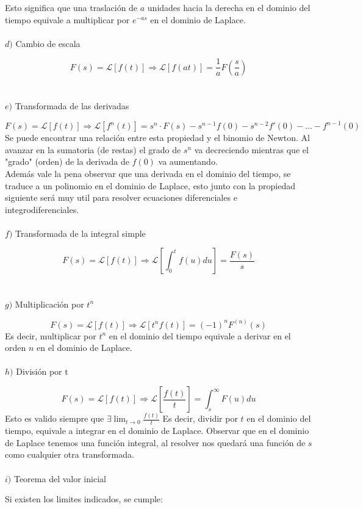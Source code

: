 \documentclass[]{article}
\begin{document}
Esto significa que una traslación de $a$ unidades hacia la derecha en el dominio del tiempo equivale a multiplicar por $e^{-as}$ en el dominio de Laplace.
\\
\\
$d)$ Cambio de escala


$$
F(s) = \mathscr{L}[f(t)] \Rightarrow \mathscr{L}[f(at)] = \frac{1}{a}F(\frac{s}{a})	
$$
\\
\\
$e)$ Transformada de las derivadas

$$
F(s) = \mathscr{L}[f(t)] \Rightarrow \mathscr{L}[f^{n}(t)] = s^{n}\cdot F(s) -s^{n-1}f(0) - s^{n-2} f'(0) - \dots - f^{n-1}(0)
$$
Se puede encontrar una relación entre esta propiedad y el binomio de Newton. Al avanzar en la sumatoria (de restas) el grado de $s^{n}$ va decreciendo mientras que el "grado" (orden) de la derivada de $f(0)$ va aumentando.\\
Además vale la pena observar que una derivada en el dominio del tiempo, se traduce a un polinomio en el dominio de Laplace, esto junto con la propiedad siguiente será muy util para resolver ecuaciones diferenciales e integrodiferenciales.
\\
\\
$f)$ Transformada de la integral simple

$$
F(s) = \mathscr{L}[f(t)] \Rightarrow \mathscr{L}[\int_{0}^{t}f(u)du] = \frac{F(s)}{s}
$$
\\
\\
$g)$ Multiplicación por $t^{n}$

$$
F(s) = \mathscr{L}[f(t)] \Rightarrow \mathscr{L}[t^{n}f(t)] = (-1)^{n}F^{(n)}(s)
$$
Es decir, multiplicar por $t^{n}$	en el dominio del tiempo equivale a derivar en el orden $n$ en el dominio de Laplace.
\\
\\
$h)$ División por t

$$
F(s) = \mathscr{L}[f(t)] \Rightarrow \mathscr{L}[\frac{f(t)}{t}] = \int_{s}^{\infty}F(u)du
$$
Esto es valido siempre que $\exists \lim_{t\rightarrow 0} \frac{f(t)}{t}$
Es decir, dividir por $t$ en el dominio del tiempo, equivale a integrar en el dominio de Laplace. Observar que en el dominio de Laplace tenemos una función integral, al resolver nos quedará una función de $s$ como cualquier otra transformada.
\\
\\
$i)$ Teorema del valor inicial

Si existen los limites indicados, se cumple:
\end{document}
